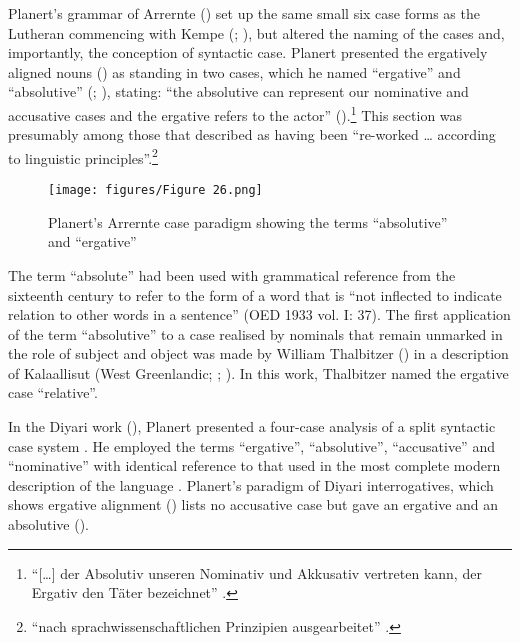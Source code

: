 Planert’s grammar of Arrernte (\citeyear[555]{planert_australische_1907}) set up the same small six case forms as the Lutheran commencing with Kempe (\citeyear{kempe_grammar_1891}; ), but altered the naming of the cases and, importantly, the conception of syntactic case. Planert presented the ergatively aligned nouns () as standing in two cases, which he named “ergative” and “absolutive” (; ), stating: “the absolutive can represent our nominative and accusative cases and the ergative refers to the actor” (\citeyear[555]{planert_australische_1907}).\footnote{“[…] der Absolutiv unseren Nominativ und Akkusativ vertreten kann, der Ergativ den Täter bezeichnet” \citep[555]{planert_australische_1907}.} This section was presumably among those that \citet[551]{planert_australische_1907} described as having been “re-worked … according to linguistic principles”.\footnote{“nach sprachwissenschaftlichen Prinzipien ausgearbeitet” \citep[551]{planert_australische_1907}.}

\begin{figure}
\texttt{[image: figures/Figure 26.png]}
\caption{Planert’s Arrernte case paradigm showing the terms “absolutive” and “ergative” \citep[555]{planert_australische_1907}}
\label{fig:2:26}
\end{figure} 

The term “absolute” had been used with grammatical reference from the sixteenth century to refer to the form of a word that is “not inflected to indicate relation to other words in a sentence” (OED 1933 vol. I: 37). The first application of the term “absolutive” to a case realised by nominals that remain unmarked in the role of subject and object was made by William Thalbitzer (\citeyear[242--243]{thalbitzer_phonetic_1904}) in a description of Kalaallisut (West Greenlandic; \citealt[198]{lindner_komposition_2013}; \citealt[231, 226]{lindner_2015}). In this work, Thalbitzer named the ergative case “relative''. 

In the Diyari work (\citeyear[689]{planert_australische_1908}), Planert presented a four-case analysis of a split syntactic case system \citep[132]{dixon_australian_2002}. He employed the terms “ergative'', “absolutive'', “accusative” and “nominative” with identical reference to that used in the most complete modern description of the language \citep[52]{austin_grammar_2013}. Planert’s paradigm of Diyari interrogatives, which shows ergative alignment () lists no accusative case but gave an ergative and an absolutive ().

